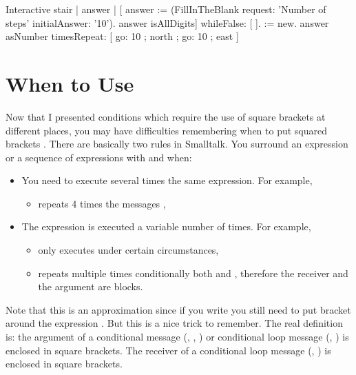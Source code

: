 \begin{scriptwithtitle}{Interactive stair}\label{scr:interactiveplusplus}
| \caro answer |
[ answer := (FillInTheBlank 
                         request: 'Number of steps' 
                         initialAnswer: '10'). 
answer isAllDigits] whileFalse: [ ]. 
\caro := \Turtle new.
answer asNumber timesRepeat:  
   [ \caro 
      go: 10 ; 
      north ; 
      go: 10 ;
      east ]
\end{scriptwithtitle}


\section{When to Use \ct{[ ]}}\label{sec:useOfparent}
Now that I presented conditions which require the use of square brackets \ct{[ ]} at different places, you may have difficulties remembering  when to put squared brackets \ct{[ ]}.  There are basically two rules in Smalltalk. You surround an expression or a sequence of expressions with \ct{[} and \ct{]} when:  

\begin{itemize}
\item You need to execute several times the same expression. For example, 
\begin{itemize}
\item {} repeats 4 times the messages , 
\end{itemize}

\item The expression is executed a variable number of times. For example,

\begin{itemize} 
\item {} only executes  under certain circumstances, 
\item {} repeats multiple times conditionally both  and , therefore the receiver and the argument are blocks.
\end{itemize}
\end{itemize}

Note that this is an approximation since if you write  you still need to put bracket around the expression . But this is a nice trick to remember. The real definition is: the argument of a conditional message (, , ) or conditional loop message (, ) is enclosed in square brackets. The receiver of a conditional loop message (, ) is enclosed in square brackets.

